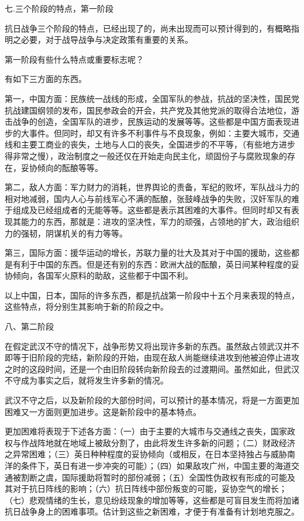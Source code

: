 七.三个阶段的特点，第一阶段

抗日战争三个阶段的特点，已经出现了的，尚未出现而可以预计得到的，有概略指明之必要，对于战导战争与决定政策有重要的关系。

第一阶段有些什么特点或重要标志呢？

有如下三方面的东西。

第一，中国方面：民族统一战线的形成，全国军队的参战，抗战的坚决性，国民党抗战建国纲领的发布，国民参政会的开会，共产党及其他党派的取得合法地位，游击战争的创造，全国军队的进步，民族运动的发展等等。这些都是中国方面表现进步的大事件。但同时，却又有许多不利事件与不良现象，例如：主要大城市，交通线和主要工商业的丧失，土地与人口的丧失，全国进步的不平等，（有些地方进步得非常之慢），政治制度之一般还仅在开始走向民主化，顽固份子与腐败现象的存在，妥协倾向的酝酿等等。

第二，敌人方面：军力财力的消耗，世界舆论的责备，军纪的败坏，军队战斗力的相对地减弱，国内人心与前线军心不满的酝酿，张鼓峰战争的失败，汉奸军队的难于组成及已经组成者的无能等等。这些都是表示其困难的大事件。但同时却又有表现其能力的东西，那就是：进攻的坚决性，军力的顽强，占领地的扩大，政治组织力的强韧，阴谋机关的有力等等。

第三，国际方面：援华运动的增长，苏联力量的壮大及其对于中国的援助，这些都是有利于中国的东西。但是还有别的东西：欧洲大战的酝酿，英日间某种程度的妥协倾向，各国军火原料的助敌，这些都于中国不利。

以上中国，日本，国际的许多东西，都是抗战第一阶段中十五个月来表现的特点，这些特点，将分别生其影响于新的阶段之中。

八、第二阶段

在假定武汉不守的情况下，战争形势又将出现许多新的东西。虽然敌占领武汉并不即等于旧阶段的完结，新阶段的开始，由现在敌人尚能继续进攻到他被迫停止进攻之时的这段时间，还是一个由旧阶段转向新阶段去的过渡期间。虽然如此，但武汉不守成为事实之后，就将发生许多新的情况。

武汉不守之后，以及新阶段的大部份时间，可以预计的基本情况，将是一方面更加困难又一方面则更加进步。这是新阶段中的基本特点。

更加困难将表现于下述各方面：（一）由于主要的大城市与交通线之丧失，国家政权与作战阵地就在地域上被敌分割了，由此将发生许多新的问题；（二）财政经济之异常困难；（三）英日种种程度的妥协倾向（或相反，在日本坚持独占与威胁南洋的条件下，英日有进一步冲突的可能）；（四）如果敌攻广州，中国主要的海道交通被割断之虞，国际援助将暂时的部份减弱；（五）全国性伪政权有形成的可能及其对于抗日阵线的影响；（六）抗日阵线中部份叛变的可能，妥协空气的增长；（七）悲观情绪的生长，意见纷歧现象的增加等等，这些都是可盲目发生而将加诸抗日战争身上的困难事项。估计到这些之新困难，才便于有准备有计划地克服之。

